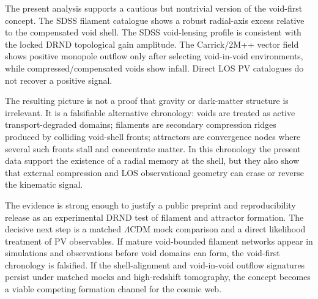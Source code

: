 \documentclass[11pt,a4paper]{article}
\begin{document}
The present analysis supports a cautious but nontrivial version of the void-first concept. The SDSS filament catalogue shows a robust radial-axis excess relative to the compensated void shell. The SDSS void-lensing profile is consistent with the locked DRND topological gain amplitude. The Carrick/2M++ vector field shows positive monopole outflow only after selecting void-in-void environments, while compressed/compensated voids show infall. Direct LOS PV catalogues do not recover a positive signal.

The resulting picture is not a proof that gravity or dark-matter structure is irrelevant. It is a falsifiable alternative chronology: voids are treated as active transport-degraded domains; filaments are secondary compression ridges produced by colliding void-shell fronts; attractors are convergence nodes where several such fronts stall and concentrate matter. In this chronology the present data support the existence of a radial memory at the shell, but they also show that external compression and LOS observational geometry can erase or reverse the kinematic signal.

The evidence is strong enough to justify a public preprint and reproducibility release as an experimental DRND test of filament and attractor formation. The decisive next step is a matched $\Lambda$CDM mock comparison and a direct likelihood treatment of PV observables. If mature void-bounded filament networks appear in simulations and observations before void domains can form, the void-first chronology is falsified. If the shell-alignment and void-in-void outflow signatures persist under matched mocks and high-redshift tomography, the concept becomes a viable competing formation channel for the cosmic web.
\end{document}
